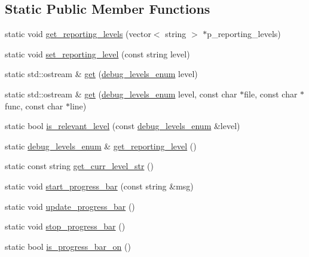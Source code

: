 \subsection*{Static Public Member Functions}
\begin{DoxyCompactItemize}
\item 
static void \hyperlink{classuva_1_1utils_1_1logging_1_1logger_a4e87773f62c839b0e4f5bb0d062a200e}{get\+\_\+reporting\+\_\+levels} (vector$<$ string $>$ $\ast$p\+\_\+reporting\+\_\+levels)
\item 
static void \hyperlink{classuva_1_1utils_1_1logging_1_1logger_a347abc5c02ffb08a5bfce9a3a23a233b}{set\+\_\+reporting\+\_\+level} (const string level)
\item 
static std\+::ostream \& \hyperlink{classuva_1_1utils_1_1logging_1_1logger_a9645bc6f008cfdc200c3b3d6d37ee727}{get} (\hyperlink{namespaceuva_1_1utils_1_1logging_ab570eadc941242827b7432ab5b7d9053}{debug\+\_\+levels\+\_\+enum} level)
\item 
static std\+::ostream \& \hyperlink{classuva_1_1utils_1_1logging_1_1logger_a83338b76954a288c863638ff39d775f0}{get} (\hyperlink{namespaceuva_1_1utils_1_1logging_ab570eadc941242827b7432ab5b7d9053}{debug\+\_\+levels\+\_\+enum} level, const char $\ast$file, const char $\ast$func, const char $\ast$line)
\item 
static bool \hyperlink{classuva_1_1utils_1_1logging_1_1logger_aa074ff5876d939a749c783cb03e2228d}{is\+\_\+relevant\+\_\+level} (const \hyperlink{namespaceuva_1_1utils_1_1logging_ab570eadc941242827b7432ab5b7d9053}{debug\+\_\+levels\+\_\+enum} \&level)
\item 
static \hyperlink{namespaceuva_1_1utils_1_1logging_ab570eadc941242827b7432ab5b7d9053}{debug\+\_\+levels\+\_\+enum} \& \hyperlink{classuva_1_1utils_1_1logging_1_1logger_ac10b979ecd675b6bed260e101ea9a89d}{get\+\_\+reporting\+\_\+level} ()
\item 
static const string \hyperlink{classuva_1_1utils_1_1logging_1_1logger_ac08dee2b96cf6ebe70c2d0e89c961f71}{get\+\_\+curr\+\_\+level\+\_\+str} ()
\item 
static void \hyperlink{classuva_1_1utils_1_1logging_1_1logger_aed155c3d996333c88c2ac5717744fba7}{start\+\_\+progress\+\_\+bar} (const string \&msg)
\item 
static void \hyperlink{classuva_1_1utils_1_1logging_1_1logger_aa97cb2a52469de6ca2d7a7260e6b6b2a}{update\+\_\+progress\+\_\+bar} ()
\item 
static void \hyperlink{classuva_1_1utils_1_1logging_1_1logger_a036e025fa032203e3e1bb277ca69db36}{stop\+\_\+progress\+\_\+bar} ()
\item 
static bool \hyperlink{classuva_1_1utils_1_1logging_1_1logger_ab858697b75736a045ed21aea7083495d}{is\+\_\+progress\+\_\+bar\+\_\+on} ()
\end{DoxyCompactItemize}


